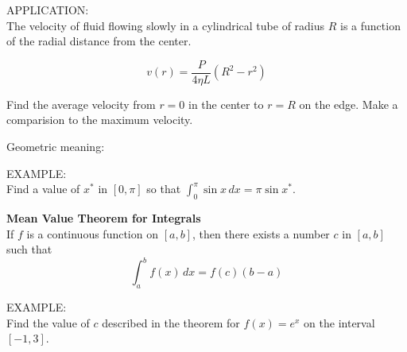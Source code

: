\documentclass[11pt]{article}
\begin{document}
\vspace{2.8in}

APPLICATION:\\

The velocity of fluid flowing slowly in a cylindrical tube of radius $R$ is a function of the radial distance from the center.

\begin{displaymath}
v(r) = \frac{P}{4\eta L}(R^2 - r^2)
  \end{displaymath}

Find the average velocity from $r=0$ in the center to $r=R$ on the edge.  Make a comparision to the maximum velocity.\\

\vspace{3.5in}


Geometric meaning:


\pagebreak

EXAMPLE:\\

Find a value of $x^*$ in $[0,\pi]$ so that $\int_0^{\pi}\sin{x} \, dx = \pi\sin{x^*}$.

\vspace{2.5in}

{\bf Mean Value Theorem for Integrals} \\

If $f$ is a continuous function on $[a,b]$, then there exists a number $c$ in $[a,b]$ such that \\
\begin{displaymath}
\int_a^b f(x) \, dx = f(c)(b-a)
\end{displaymath}  

\vspace{1.7in}

  EXAMPLE:\\

  Find the value of $c$ described in the theorem for $f(x) = e^x $ on the interval $[-1,3]$.
\end{document}
